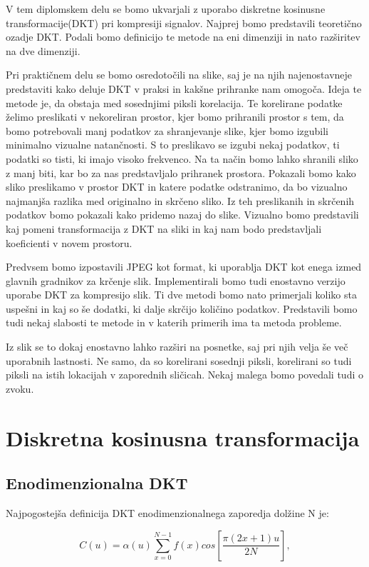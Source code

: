 \documentclass[a4paper, 12pt]{book}
\begin{document}
V tem diplomskem delu se bomo ukvarjali z uporabo diskretne kosinusne transformacije(DKT) pri kompresiji signalov. Najprej bomo predstavili teoretično ozadje DKT. Podali bomo definicijo te metode na eni dimenziji in nato razširitev na dve dimenziji.\par 
Pri praktičnem delu se bomo osredotočili na slike, saj je na njih najenostavneje predstaviti kako deluje DKT v praksi in kakšne prihranke nam omogoča. Ideja te metode je, da obstaja med sosednjimi piksli korelacija. Te korelirane podatke želimo preslikati v nekoreliran prostor, kjer bomo prihranili prostor s tem, da bomo potrebovali manj podatkov za shranjevanje slike, kjer bomo izgubili minimalno vizualne natančnosti. S to preslikavo se izgubi nekaj podatkov, ti podatki so tisti, ki imajo visoko frekvenco. Na ta način bomo lahko shranili sliko z manj biti, kar bo za nas predstavljalo prihranek prostora. Pokazali bomo kako sliko preslikamo v prostor DKT in katere podatke odstranimo, da bo vizualno najmanjša razlika med originalno in skrčeno sliko. Iz teh preslikanih in skrčenih podatkov bomo pokazali kako pridemo nazaj do slike. Vizualno bomo predstavili kaj pomeni transformacija z DKT na sliki in kaj nam bodo predstavljali koeficienti v novem prostoru. \par
Predvsem bomo izpostavili JPEG kot format, ki uporablja DKT kot enega izmed glavnih gradnikov za krčenje slik. Implementirali bomo tudi enostavno verzijo uporabe DKT za kompresijo slik. Ti dve metodi bomo nato primerjali koliko sta uspešni in kaj so še dodatki, ki dalje skrčijo količino podatkov. Predstavili bomo tudi nekaj slabosti te metode in v katerih primerih ima ta metoda probleme. \par
Iz slik se to dokaj enostavno lahko razširi na posnetke, saj pri njih velja še več uporabnih lastnosti. Ne samo, da so korelirani sosednji piksli, korelirani so tudi piksli na istih lokacijah v zaporednih sličicah. Nekaj malega bomo povedali tudi o zvoku.


\chapter{Diskretna kosinusna transformacija}
\label{ch0}
\section{Enodimenzionalna DKT}
Najpogostejša definicija DKT enodimenzionalnega zaporedja dolžine N je:

\begin{equation}
C(u) = \alpha(u)  \sum_{x=0}^{N-1} f(x)cos[\frac{\pi(2x+1)u}{2N}],  
\label{eq:1}
\end{equation}
\end{document}
